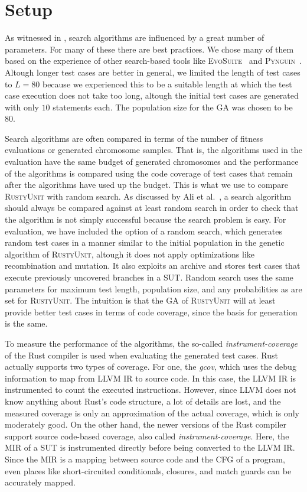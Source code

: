 \documentclass[paper=a4,%
  twoside,%
  BCOR4mm,%
  abstract=true,%
  toc=bibliography,%
  chapterprefix=true,%
  toc=bibliographynumbered,%
  open=right,%
  english,%
  pagesize=pdftex]{scrreprt}
\newcommand{\tech}{\textsc{RustyUnit}\xspace}
\newcommand{\mir}{\ac{MIR}\xspace}
\newcommand{\cfg}{\ac{CFG}\xspace}
\newcommand{\sut}{\ac{SUT}\xspace}
\begin{document}
\section{Setup}
\label{sec:environment-setup}
As witnessed in , search algorithms are influenced by a great number of parameters. For many of these there are best practices. We chose many of them based on the experience of other search-based tools like \textsc{EvoSuite}~\cite{Fraser_2011a} and \textsc{Pynguin}~\cite{Lukasczyk2020}. Altough longer test cases are better in general, we limited the length of test cases to $L = 80$ because we experienced this to be a suitable length at which the test case execution does not take too long, altough the initial test cases are generated with only $10$ statements each. The population size for the \ac{GA} was chosen to be $80$.

Search algorithms are often compared in terms of the number of fitness evaluations or generated chromosome samples. That is, the algorithms used in the evaluation have the same budget of generated chromosomes and the performance of the algorithms is compared using the code coverage of test cases that remain after the algorithms have used up the budget. This is what we use to compare \tech with random search. As discussed by Ali et al.~\cite{Ali2010}, a search algorithm should always be compared against at least random search in order to check that the algorithm is not simply successful because the search problem is easy. For evaluation, we have included the option of a random search, which generates random test cases in a manner similar to the initial population in the genetic algorithm of \tech, altough it does not apply optimizations like recombination and mutation. It also exploits an archive and stores test cases that execute previously uncovered branches in a \sut. Random search uses the same parameters for maximum test length, population size, and any probabilities as are set for \tech. The intuition is that the \ac{GA} of \tech will at least provide better test cases in terms of code coverage, since the basis for generation is the same. %

To measure the performance of the algorithms, the so-called \emph{instrument-coverage} of the Rust compiler is used when evaluating the generated test cases. Rust actually supports two types of coverage. For one, the \emph{gcov}, which uses the debug information to map from LLVM \ac{IR} to source code. In this case, the LLVM \ac{IR} is instrumented to count the executed instructions. However, since LLVM does not know anything about Rust's code structure, a lot of details are lost, and the measured coverage is only an approximation of the actual coverage, which is only moderately good. On the other hand, the newer versions of the Rust compiler support source code-based coverage, also called \emph{instrument-coverage}. Here, the \mir of a \sut is instrumented directly before being converted to the LLVM \ac{IR}. Since the \mir is a mapping between source code and the \cfg of a program, even places like short-circuited conditionals, closures, and match guards can be accurately mapped.
\end{document}
